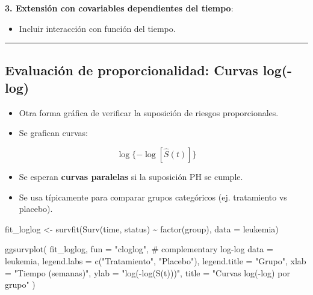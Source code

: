 \documentclass[
]{article}
\newenvironment{Shaded}{\begin{snugshade}}{\end{snugshade}}
\newcommand{\AttributeTok}[1]{\textcolor[rgb]{0.40,0.45,0.13}{#1}}
\newcommand{\CommentTok}[1]{\textcolor[rgb]{0.37,0.37,0.37}{#1}}
\newcommand{\FunctionTok}[1]{\textcolor[rgb]{0.28,0.35,0.67}{#1}}
\newcommand{\NormalTok}[1]{\textcolor[rgb]{0.00,0.23,0.31}{#1}}
\newcommand{\OtherTok}[1]{\textcolor[rgb]{0.00,0.23,0.31}{#1}}
\newcommand{\SpecialCharTok}[1]{\textcolor[rgb]{0.37,0.37,0.37}{#1}}
\newcommand{\StringTok}[1]{\textcolor[rgb]{0.13,0.47,0.30}{#1}}
\providecommand{\tightlist}{%
  \setlength{\itemsep}{0pt}\setlength{\parskip}{0pt}}
\begin{document}
\textbf{3. Extensión con covariables dependientes del tiempo}:

\begin{itemize}
\tightlist
\item
  Incluir interacción con función del tiempo.
\end{itemize}

\begin{center}\rule{0.5\linewidth}{0.5pt}\end{center}

\subsection{Evaluación de proporcionalidad: Curvas
log(-log)}\label{evaluaciuxf3n-de-proporcionalidad-curvas-log-log}

\begin{itemize}
\tightlist
\item
  Otra forma gráfica de verificar la suposición de riesgos
  proporcionales.
\item
  Se grafican curvas:
\end{itemize}

\[
\log\{-\log[\hat{S}(t)]\}
\]

\begin{itemize}
\tightlist
\item
  Se esperan \textbf{curvas paralelas} si la suposición PH se cumple.
\item
  Se usa típicamente para comparar grupos categóricos (ej. tratamiento
  vs placebo).
\end{itemize}

\begin{Shaded}
\begin{Highlighting}[]
\NormalTok{fit\_loglog }\OtherTok{\textless{}{-}} \FunctionTok{survfit}\NormalTok{(}\FunctionTok{Surv}\NormalTok{(time, status) }\SpecialCharTok{\textasciitilde{}} \FunctionTok{factor}\NormalTok{(group), }\AttributeTok{data =}\NormalTok{ leukemia)}

\FunctionTok{ggsurvplot}\NormalTok{(}
\NormalTok{  fit\_loglog,}
  \AttributeTok{fun =} \StringTok{"cloglog"}\NormalTok{,  }\CommentTok{\# complementary log{-}log}
  \AttributeTok{data =}\NormalTok{ leukemia,}
  \AttributeTok{legend.labs =} \FunctionTok{c}\NormalTok{(}\StringTok{"Tratamiento"}\NormalTok{, }\StringTok{"Placebo"}\NormalTok{),}
  \AttributeTok{legend.title =} \StringTok{"Grupo"}\NormalTok{,}
  \AttributeTok{xlab =} \StringTok{"Tiempo (semanas)"}\NormalTok{,}
  \AttributeTok{ylab =} \StringTok{"log({-}log(S(t)))"}\NormalTok{,}
  \AttributeTok{title =} \StringTok{"Curvas log({-}log) por grupo"}
\NormalTok{)}
\end{Highlighting}
\end{Shaded}
\end{document}
